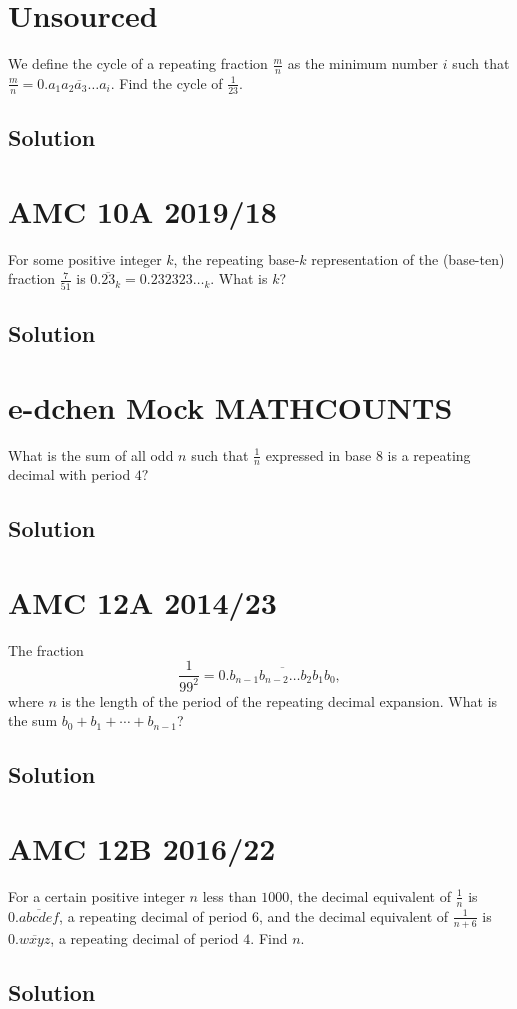 \documentclass[mast]{lucky}
\begin{document}
\pagebreak\section{Unsourced}

We define the cycle of a repeating fraction $\tfrac{m}{n}$ as the minimum number $i$ such that $\tfrac{m}{n} = 0.\overline{a_1a_2a_3\dots a_i}$. Find the cycle of $\tfrac{1}{23}$.

\subsection{Solution}

\pagebreak\section{AMC 10A 2019/18}

For some positive integer $k$, the repeating base-$k$ representation of the (base-ten) fraction $\frac{7}{51}$ is $0.\overline{23}_k = 0.232323\ldots_k$. What is $k$?

\subsection{Solution}

\pagebreak\section{e-dchen Mock MATHCOUNTS}

What is the sum of all odd $n$ such that $\frac{1}{n}$ expressed in base $8$ is a repeating decimal with period $4?$

\subsection{Solution}

\pagebreak\section{AMC 12A 2014/23}

The fraction\[\dfrac1{99^2}=0.\overline{b_{n-1}b_{n-2}\ldots b_2b_1b_0},\]where $n$ is the length of the period of the repeating decimal expansion. What is the sum $b_0+b_1+\cdots+b_{n-1}$?

\subsection{Solution}

\pagebreak\section{AMC 12B 2016/22}

For a certain positive integer $n$ less than $1000$, the decimal equivalent of $\frac{1}{n}$ is $0.\overline{abcdef}$, a repeating decimal of period $6$, and the decimal equivalent of $\frac{1}{n+6}$ is $0.\overline{wxyz}$, a repeating decimal of period $4$. Find $n.$

\subsection{Solution}
\end{document}

